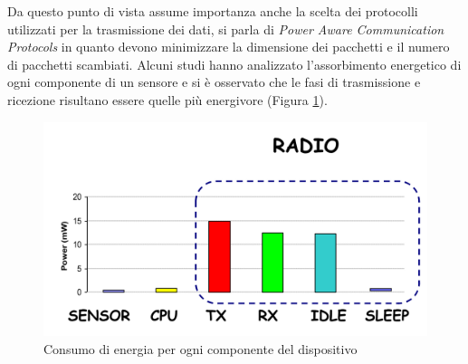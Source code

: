 	Da questo punto di vista assume importanza anche la scelta dei protocolli utilizzati per la trasmissione dei dati, si parla di \emph{Power Aware Communication Protocols} in quanto devono minimizzare la dimensione dei pacchetti e il numero di pacchetti scambiati.
	Alcuni studi hanno analizzato l'assorbimento energetico di ogni componente di un sensore e si è osservato che le fasi di trasmissione e ricezione risultano essere quelle più energivore (Figura \ref{fig:consumoEnergiaDispositivo}).
	
	\begin{figure}[h]
		\includegraphics[width=\textwidth]{lez3/img/consumoEnergiaDispositivo.png}
		\caption{Consumo di energia per ogni componente del dispositivo}
		\label{fig:consumoEnergiaDispositivo}
	\end{figure}
	
	
	
	
	